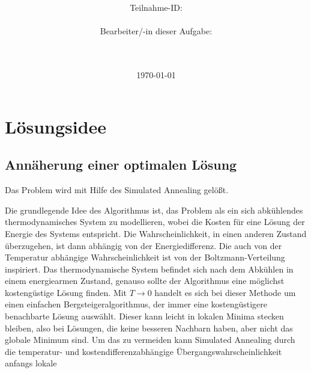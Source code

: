 \documentclass[a4paper,10pt,ngerman]{scrartcl}
\title{\textbf{\Huge\Aufgabe}}
\author{\LARGE Teilnahme-ID: \LARGE \TeilnahmeId \\\\
  \LARGE Bearbeiter/-in dieser Aufgabe: \\
  \LARGE \Name\\\\}
\date{\LARGE\today}
\begin{document}
\maketitle
\tableofcontents

\vspace{0.5cm}

\section{Lösungsidee}
\subsection{Annäherung einer optimalen Lösung}
Das Problem wird mit Hilfe des Simulated Annealing \cite{kirkpatrick_1983}
gelößt.
\begin{algorithmic}
  \EndIf
  \EndIf
  \EndWhile

  \EndProcedure
\end{algorithmic}
Die grundlegende Idee des Algorithmus ist, das Problem als ein sich abkühlendes thermodynamisches System zu modellieren,
wobei die Kosten für eine Lösung der Energie des Systems entspricht. Die Wahrscheinlichkeit, in einen anderen
Zustand überzugehen, ist dann abhängig von der Energiedifferenz. Die auch von der Temperatur abhängige Wahrscheinlichkeit
ist von der Boltzmann-Verteilung inspiriert. Das thermodynamische System befindet sich nach dem Abkühlen in einem
energiearmen Zustand, genauso sollte der Algorithmus eine möglichst kostengüstige Lösung finden. Mit $T\to 0$ handelt es sich
bei dieser Methode um einen einfachen Bergsteigeralgorithmus, der immer eine kostengüstigere benachbarte Lösung auswählt. Dieser
kann leicht in lokalen Minima stecken bleiben, also bei Lösungen, die keine besseren Nachbarn haben, aber nicht das globale Minimum sind.
Um das zu vermeiden kann Simulated Annealing durch die temperatur- und kostendifferenzabhängige Übergangswahrscheinlichkeit anfangs lokale
\end{document}
